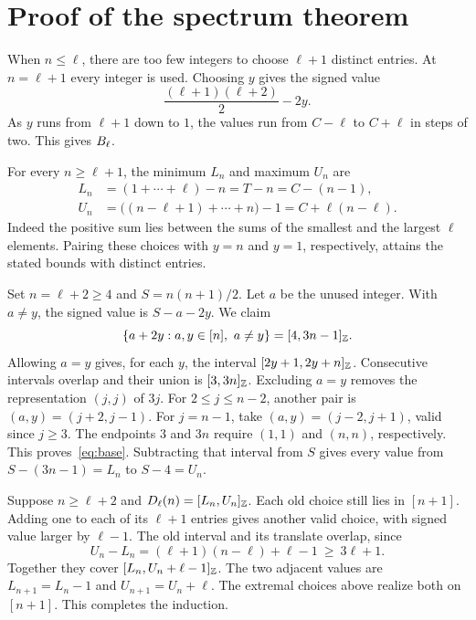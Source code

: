 \documentclass[11pt,a4paper]{article}
\begin{document}
\clearpage
\section{Proof of the spectrum theorem}
When \(n\le\ell\), there are too few integers to choose \(\ell+1\) distinct entries.
At \(n=\ell+1\) every integer is used. Choosing \(y\) gives the signed value
\[
 \frac{(\ell+1)(\ell+2)}2-2y.
\]
As \(y\) runs from \(\ell+1\) down to \(1\), the values run from \(C-\ell\) to \(C+\ell\) in steps of two. This gives \(B_\ell\).

For every \(n\ge\ell+1\), the minimum \(L_n\) and maximum \(U_n\) are
\begin{align*}
 L_n &= (1+\cdots+\ell)-n=T-n=C-(n-1),\\
 U_n &= \bigl((n-\ell+1)+\cdots+n\bigr)-1=C+\ell(n-\ell).
\end{align*}
Indeed the positive sum lies between the sums of the smallest and the largest \(\ell\) elements. Pairing these choices with \(y=n\) and \(y=1\), respectively, attains the stated bounds with distinct entries.

Set \(n=\ell+2\ge4\) and \(S=n(n+1)/2\). Let \(a\) be the unused integer. With \(a\ne y\), the signed value is \(S-a-2y\). We claim
\begin{equation}\label{eq:base}
 \{a+2y:a,y\in[n],\ a\ne y\}=[4,3n-1]_{\mathbb Z}.
\end{equation}
Allowing \(a=y\) gives, for each \(y\), the interval \([2y+1,2y+n]_{\mathbb Z}\). Consecutive intervals overlap and their union is \([3,3n]_{\mathbb Z}\). Excluding \(a=y\) removes the representation \((j,j)\) of \(3j\). For \(2\le j\le n-2\), another pair is \((a,y)=(j+2,j-1)\). For \(j=n-1\), take \((a,y)=(j-2,j+1)\), valid since \(j\ge3\). The endpoints \(3\) and \(3n\) require \((1,1)\) and \((n,n)\), respectively. This proves~\eqref{eq:base}. Subtracting that interval from \(S\) gives every value from \(S-(3n-1)=L_n\) to \(S-4=U_n\).

Suppose \(n\ge\ell+2\) and \(D_\ell(n)=[L_n,U_n]_{\mathbb Z}\). Each old choice still lies in \([n+1]\). Adding one to each of its \(\ell+1\) entries gives another valid choice, with signed value larger by \(\ell-1\). The old interval and its translate overlap, since
\[
 U_n-L_n=(\ell+1)(n-\ell)+\ell-1\ \ge\ 3\ell+1.
\]
Together they cover \([L_n,U_n+\ell-1]_{\mathbb Z}\). The two adjacent values are \(L_{n+1}=L_n-1\) and \(U_{n+1}=U_n+\ell\). The extremal choices above realize both on \([n+1]\). This completes the induction.\proofsquare
\end{document}
